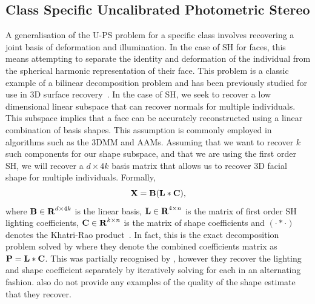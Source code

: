\subsection{Class Specific Uncalibrated Photometric Stereo}\label{subsec:imag_coll_class_uncalibrated_ps}
A generalisation of the U-PS problem for a specific class involves
recovering a joint basis of deformation and illumination. In the case of SH for
faces, this means attempting to separate the identity and deformation of the
individual from the spherical harmonic representation of their face. 
This problem is a classic example of a bilinear
decomposition problem and has been previously studied for use in 3D surface
recovery~\cite{zhou2007appearance,minsik2014realtime,minsik2011fast,%
lee2005bilinear,KemelmacherShlizerman:2013iv}. In
the case of SH, we seek to recover a low dimensional linear subspace that can
recover normals for multiple individuals. This subspace implies that a face can
be accurately reconstructed using a linear combination of basis shapes. This
assumption is commonly employed in algorithms such as the 3DMM and AAMs.
Assuming that we want to recover $k$ such components for our shape subspace, and
that we are using the first order SH, we will recover a $d \times 4k$ basis
matrix that allows us to recover 3D facial shape for multiple individuals.
Formally,
\begin{equation}\label{eq:class_specific_ps}
        \boldsymbol{\mathbf{X}} = \boldsymbol{\mathbf{B}} (\boldsymbol{\mathbf{L}} \ast \boldsymbol{\mathbf{C}}),
\end{equation}
where $\boldsymbol{\mathbf{B}} \in \boldsymbol{\mathbf{R}}^{d \times 4k}$ is the linear basis,
$\boldsymbol{\mathbf{L}} \in \boldsymbol{\mathbf{R}}^{4 \times n}$ is the matrix of first order SH lighting
coefficients, $\boldsymbol{\mathbf{C}} \in \boldsymbol{\mathbf{R}}^{k \times n}$ is the matrix of shape
coefficients and $(\cdot \ast \cdot)$ denotes the Khatri-Rao
product~\cite{khatri1968solutions}. In fact, this is the exact decomposition problem
solved by \citet{KemelmacherShlizerman:2013iv} where they denote the combined
coefficients matrix as $\boldsymbol{\mathbf{P}} = \boldsymbol{\mathbf{L}} \ast \boldsymbol{\mathbf{C}}$. This was partially
recognised by \citet{zhou2007appearance}, however they recover the lighting and
shape coefficient separately by iteratively solving for each in an alternating
fashion. \citet{zhou2007appearance} also do not provide any examples of the
quality of the shape estimate that they recover.

